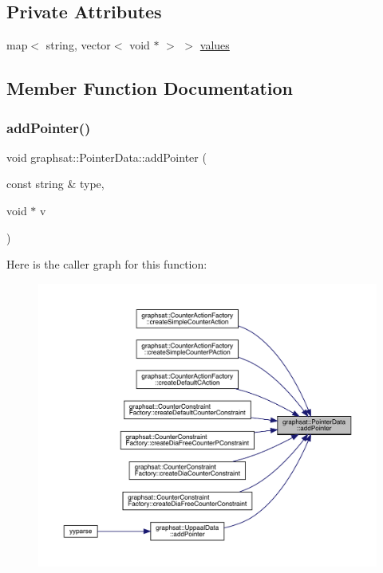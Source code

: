 \subsection*{Private Attributes}
\begin{DoxyCompactItemize}
\item 
map$<$ string, vector$<$ void $\ast$ $>$ $>$ \mbox{\hyperlink{classgraphsat_1_1_pointer_data_ad0048e39af1eeb839e0d0c5ef2e4051a}{values}}
\end{DoxyCompactItemize}


\subsection{Member Function Documentation}
\mbox{\label{classgraphsat_1_1_pointer_data_ad4e7d9f0c58993ce58b06c0bd9e0cb1f}} 
\subsubsection{\texorpdfstring{addPointer()}{addPointer()}}
{\footnotesize\ttfamily void graphsat\+::\+Pointer\+Data\+::add\+Pointer (\begin{DoxyParamCaption}\item[{const string \&}]{type,  }\item[{void $\ast$}]{v }\end{DoxyParamCaption})\hspace{0.3cm}{\ttfamily [inline]}}

Here is the caller graph for this function\+:\nopagebreak
\begin{figure}[H]
\begin{center}
\leavevmode
\includegraphics[width=350pt]{classgraphsat_1_1_pointer_data_ad4e7d9f0c58993ce58b06c0bd9e0cb1f_icgraph}
\end{center}
\end{figure}
\mbox{\label{classgraphsat_1_1_pointer_data_ad550598884f265fc41845f2818070422}} 
